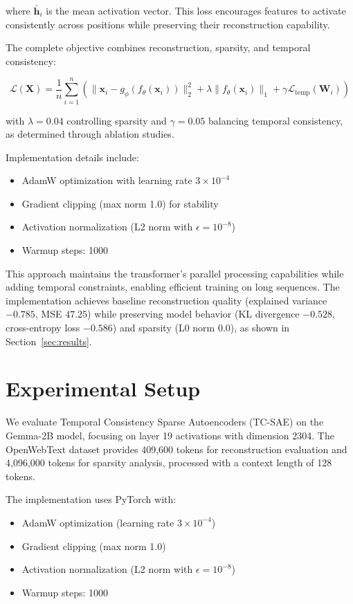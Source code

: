 \documentclass{article} %
\begin{document}
where $\bar{\mathbf{h}}_i$ is the mean activation vector. This loss encourages features to activate consistently across positions while preserving their reconstruction capability.

The complete objective combines reconstruction, sparsity, and temporal consistency:

\begin{equation}
    \mathcal{L}(\mathbf{X}) = \frac{1}{n} \sum_{i=1}^n \left( \|\mathbf{x}_i - g_\phi(f_\theta(\mathbf{x}_i))\|_2^2 + \lambda \|f_\theta(\mathbf{x}_i)\|_1 + \gamma \mathcal{L}_{\text{temp}}(\mathbf{W}_i) \right)
\end{equation}

with $\lambda=0.04$ controlling sparsity and $\gamma=0.05$ balancing temporal consistency, as determined through ablation studies.

Implementation details include:
\begin{itemize}
    \item AdamW optimization with learning rate $3 \times 10^{-4}$
    \item Gradient clipping (max norm 1.0) for stability
    \item Activation normalization (L2 norm with $\epsilon=10^{-8}$)
    \item Warmup steps: 1000
\end{itemize}

This approach maintains the transformer's parallel processing capabilities while adding temporal constraints, enabling efficient training on long sequences. The implementation achieves baseline reconstruction quality (explained variance $-0.785$, MSE $47.25$) while preserving model behavior (KL divergence $-0.528$, cross-entropy loss $-0.586$) and sparsity (L0 norm $0.0$), as shown in Section~\ref{sec:results}.

\section{Experimental Setup}
\label{sec:experimental}

We evaluate Temporal Consistency Sparse Autoencoders (TC-SAE) on the Gemma-2B model, focusing on layer 19 activations with dimension 2304. The OpenWebText dataset provides 409,600 tokens for reconstruction evaluation and 4,096,000 tokens for sparsity analysis, processed with a context length of 128 tokens.

The implementation uses PyTorch with:
\begin{itemize}
    \item AdamW optimization (learning rate $3 \times 10^{-4}$)
    \item Gradient clipping (max norm 1.0)
    \item Activation normalization (L2 norm with $\epsilon=10^{-8}$)
    \item Warmup steps: 1000
\end{itemize}
\end{document}
